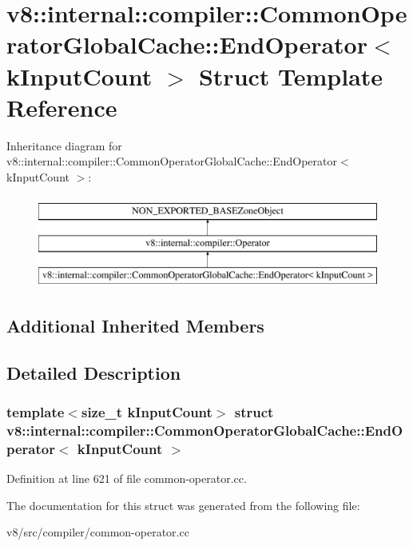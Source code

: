 \hypertarget{structv8_1_1internal_1_1compiler_1_1CommonOperatorGlobalCache_1_1EndOperator}{}\section{v8\+:\+:internal\+:\+:compiler\+:\+:Common\+Operator\+Global\+Cache\+:\+:End\+Operator$<$ k\+Input\+Count $>$ Struct Template Reference}
\label{structv8_1_1internal_1_1compiler_1_1CommonOperatorGlobalCache_1_1EndOperator}
Inheritance diagram for v8\+:\+:internal\+:\+:compiler\+:\+:Common\+Operator\+Global\+Cache\+:\+:End\+Operator$<$ k\+Input\+Count $>$\+:\begin{figure}[H]
\begin{center}
\leavevmode
\includegraphics[height=3.000000cm]{structv8_1_1internal_1_1compiler_1_1CommonOperatorGlobalCache_1_1EndOperator}
\end{center}
\end{figure}
\subsection*{Additional Inherited Members}


\subsection{Detailed Description}
\subsubsection*{template$<$size\+\_\+t k\+Input\+Count$>$\newline
struct v8\+::internal\+::compiler\+::\+Common\+Operator\+Global\+Cache\+::\+End\+Operator$<$ k\+Input\+Count $>$}



Definition at line 621 of file common-\/operator.\+cc.



The documentation for this struct was generated from the following file\+:\begin{DoxyCompactItemize}
\item 
v8/src/compiler/common-\/operator.\+cc\end{DoxyCompactItemize}
